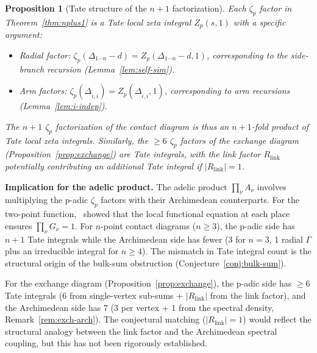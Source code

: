 \documentclass[11pt,a4paper]{article}
\newtheorem{proposition}{Proposition}
\begin{document}
\begin{proposition}[Tate structure of the $n{+}1$ factorization]
\label{prop:tate}
Each $\zeta_p$ factor in Theorem~\ref{thm:nplus1} is a Tate local zeta integral $Z_p(s, 1)$ with a specific argument:
\begin{itemize}[leftmargin=2em]
    \item Radial factor: $\zeta_p(\Delta_{1\cdots n} - d) = Z_p(\Delta_{1\cdots n} - d, 1)$, corresponding to the side-branch recursion (Lemma~\ref{lem:self-sim}).
    \item Arm factors: $\zeta_p(\Delta_{\hat{i},i}) = Z_p(\Delta_{\hat{i},i}, 1)$, corresponding to arm recursions (Lemma~\ref{lem:i-indep}).
\end{itemize}
The $n{+}1$ $\zeta_p$ factorization of the contact diagram is thus an $n{+}1$-fold product of Tate local zeta integrals. Similarly, the $\geq 6$ $\zeta_p$ factors of the exchange diagram (Proposition~\ref{prop:exchange}) are Tate integrals, with the link factor $R_{\mathrm{link}}$ potentially contributing an additional Tate integral if $|R_{\mathrm{link}}| = 1$.
\end{proposition}

\textbf{Implication for the adelic product.} The adelic product $\prod_\nu A_\nu$ involves multiplying the p-adic $\zeta_p$ factors with their Archimedean counterparts. For the two-point function,~\cite{HSYZ20} showed that the local functional equation at each place ensures $\prod_\nu G_\nu = 1$. For $n$-point contact diagrams ($n \geq 3$), the p-adic side has $n{+}1$ Tate integrals while the Archimedean side has fewer (3 for $n=3$, 1 radial $\Gamma$ plus an irreducible integral for $n \geq 4$). The mismatch in Tate integral count is the structural origin of the bulk-sum obstruction (Conjecture~\ref{conj:bulk-sum}).

For the exchange diagram (Proposition~\ref{prop:exchange}), the p-adic side has $\geq 6$ Tate integrals (6 from single-vertex sub-sums + $|R_{\mathrm{link}}|$ from the link factor), and the Archimedean side has 7 (3 per vertex + 1 from the spectral density, Remark~\ref{rem:exch-arch}). The conjectural matching ($|R_{\mathrm{link}}| = 1$) would reflect the structural analogy between the link factor and the Archimedean spectral coupling, but this has not been rigorously established.
\end{document}
